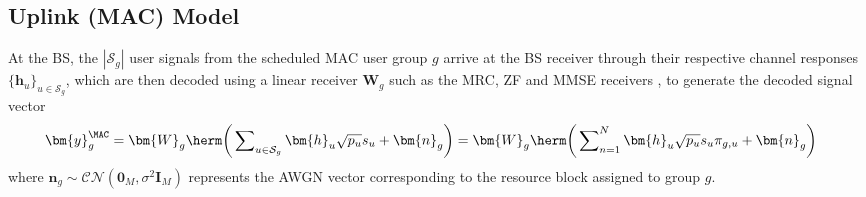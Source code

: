 \subsection{Uplink (MAC) Model} \label{system:ssec:usch_mac}

At the BS, the $|\mathcal{S}_g|$ user signals from the scheduled MAC user group $g$ arrive at the BS receiver through their respective channel responses $\{\bm{h}_u\}_{u\in\mathcal{S}_g}$, which are then decoded using a linear receiver $\bm{W}_g$ such as the MRC, ZF and MMSE receivers \cite{Tse05}, to generate the decoded signal vector
\begin{align}\label{system:eqn:usch_sig_mac}
	\bm{y}_g^{\MAC}&= \bm{W}_g\herm\bigg(\sum\nolimits_{u \in \mathcal{S}_g} \bm{h}_u\sqrt {p_{u}}s_{u}  + \bm{n}_g\bigg)
	=\bm{W}_g\herm\bigg(\sum\nolimits_{n=1}^N \bm{h}_u\sqrt {p_{u}}s_{u}\pi_{g,u}  + \bm{n}_g\bigg)
\end{align}
where 
$\bm{n}_g\sim \mathcal{CN}(\bm{0}_M,\sigma^2 \bm{I}_{M})$ represents the AWGN vector corresponding to the resource block assigned to group $g$.

